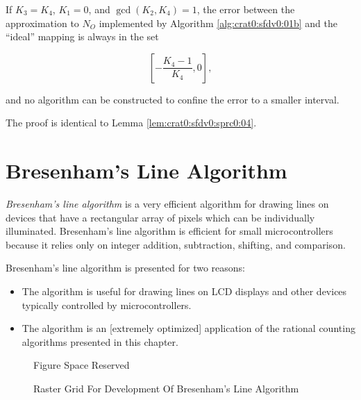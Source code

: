 \begin{vworklemmastatement}
\label{lem:crat0:sfdv0:sprc2:03}
If $K_3=K_4$, $K_1=0$, and $\gcd(K_2, K_4)=1$, the error between
the approximation to $N_O$ implemented by Algorithm \ref{alg:crat0:sfdv0:01b} 
and the ``ideal'' mapping is always
in the set

\begin{equation}
\label{eq:lem:crat0:sfdv0:sprc2:03:01}
\left[ - \frac{K_4 - 1}{K_4} , 0 \right] ,
\end{equation}

and no algorithm can be constructed to 
confine the error to a smaller interval.
\end{vworklemmastatement}
\begin{vworklemmaproof}
The proof is identical to Lemma \ref{lem:crat0:sfdv0:sprc0:04}.
\end{vworklemmaproof}







\section{Bresenham's Line Algorithm}
\label{crat0:sbla0}

\emph{Bresenham's line algorithm} is a
very efficient algorithm for drawing lines on devices that have 
a rectangular array of pixels which can be individually illuminated.
Bresenham's line algorithm is efficient for small microcontrollers
because it relies only 
on integer addition, subtraction, shifting, and comparison.

Bresenham's line algorithm is presented for two reasons:

\begin{itemize}
\item The algorithm is useful for drawing lines on LCD
      displays and other devices typically controlled by
      microcontrollers.
\item The algorithm is an [extremely optimized] application 
      of the rational
      counting algorithms presented in this chapter.
\end{itemize}

\begin{figure}
\begin{center}
\begin{huge}
Figure Space Reserved
\end{huge}
\end{center}
\caption{Raster Grid For Development Of Bresenham's Line Algorithm}
\label{fig:crat0:sbla0:01}
\end{figure}

